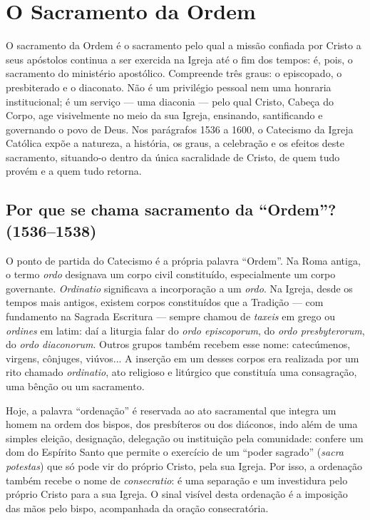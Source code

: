 \chapter{O Sacramento da Ordem}

O sacramento da Ordem é o sacramento pelo qual a missão confiada por Cristo a seus apóstolos continua a ser exercida na Igreja até o fim dos tempos: é, pois, o sacramento do ministério apostólico. Compreende três graus: o episcopado, o presbiterado e o diaconato. Não é um privilégio pessoal nem uma honraria institucional; é um serviço --- uma diaconia --- pelo qual Cristo, Cabeça do Corpo, age visivelmente no meio da sua Igreja, ensinando, santificando e governando o povo de Deus. Nos parágrafos 1536 a 1600, o Catecismo da Igreja Católica expõe a natureza, a história, os graus, a celebração e os efeitos deste sacramento, situando-o dentro da única sacralidade de Cristo, de quem tudo provém e a quem tudo retorna.

\section{Por que se chama sacramento da ``Ordem''? (1536--1538)}

O ponto de partida do Catecismo é a própria palavra ``Ordem''. Na Roma antiga, o termo \textit{ordo} designava um corpo civil constituído, especialmente um corpo governante. \textit{Ordinatio} significava a incorporação a um \textit{ordo}. Na Igreja, desde os tempos mais antigos, existem corpos constituídos que a Tradição --- com fundamento na Sagrada Escritura --- sempre chamou de \textit{taxeis} em grego ou \textit{ordines} em latim: daí a liturgia falar do \textit{ordo episcoporum}, do \textit{ordo presbyterorum}, do \textit{ordo diaconorum}. Outros grupos também recebem esse nome: catecúmenos, virgens, cônjuges, viúvos... A inserção em um desses corpos era realizada por um rito chamado \textit{ordinatio}, ato religioso e litúrgico que constituía uma consagração, uma bênção ou um sacramento.

Hoje, a palavra ``ordenação'' é reservada ao ato sacramental que integra um homem na ordem dos bispos, dos presbíteros ou dos diáconos, indo além de uma simples eleição, designação, delegação ou instituição pela comunidade: confere um dom do Espírito Santo que permite o exercício de um ``poder sagrado'' (\textit{sacra potestas}) que só pode vir do próprio Cristo, pela sua Igreja. Por isso, a ordenação também recebe o nome de \textit{consecratio}: é uma separação e um investidura pelo próprio Cristo para a sua Igreja. O sinal visível desta ordenação é a imposição das mãos pelo bispo, acompanhada da oração consecratória.

